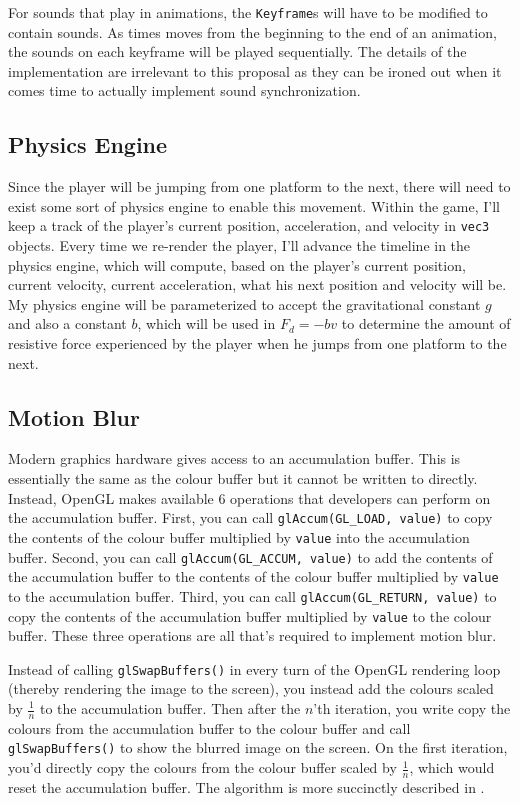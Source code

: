 \documentclass[11pt]{article}
\begin{document}
For sounds that play in animations, the \verb|Keyframe|s will have to be modified to contain sounds. As times moves from the beginning to the end of an animation, the sounds on each keyframe will be played sequentially. The details of the implementation are irrelevant to this proposal as they can be ironed out when it comes time to actually implement sound synchronization.

\subsection{Physics Engine}
Since the player will be jumping from one platform to the next, there will need to exist some sort of physics engine to enable this movement. Within the game, I'll keep a track of the player's current position, acceleration, and velocity in \verb|vec3| objects. Every time we re-render the player, I'll advance the timeline in the physics engine, which will compute, based on the player's current position, current velocity, current acceleration, what his next position and velocity will be. My physics engine will be parameterized to accept the gravitational constant $g$ and also a constant $b$, which will be used in $F_d = -bv$ to determine the amount of resistive force experienced by the player when he jumps from one platform to the next.

\subsection{Motion Blur}
Modern graphics hardware gives access to an accumulation buffer. This is essentially the same as the colour buffer but it cannot be written to directly. Instead, OpenGL makes available 6 operations that developers can perform on the accumulation buffer. First, you can call \verb|glAccum(GL_LOAD, value)| to copy the contents of the colour buffer multiplied by \verb|value| into the accumulation buffer. Second, you can call \verb|glAccum(GL_ACCUM, value)| to add the contents of the accumulation buffer to the contents of the colour buffer multiplied by \verb|value| to the accumulation buffer. Third, you can call \verb|glAccum(GL_RETURN, value)| to copy the contents of the accumulation buffer multiplied by \verb|value| to the colour buffer. These three operations are all that's required to implement motion blur.

Instead of calling \verb|glSwapBuffers()| in every turn of the OpenGL rendering loop (thereby rendering the image to the screen), you instead add the colours scaled by $\frac{1}{n}$ to the accumulation buffer. Then after the $n$'th iteration, you write copy the colours from the accumulation buffer to the colour buffer and call \verb|glSwapBuffers()| to show the blurred image on the screen. On the first iteration, you'd directly copy the colours from the colour buffer scaled by $\frac{1}{n}$, which would reset the accumulation buffer. The algorithm is more succinctly described in \cite{wikibooks-motion-blur}. 
\end{document}
